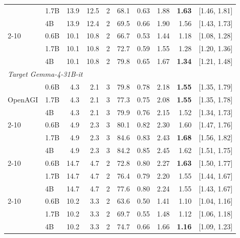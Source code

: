 \begin{table}[t]
\begin{tabular}{llrrrrrrrc}
                & 1.7B & 13.9 & 12.5 & 2 & 68.1 & 0.63 & 1.88 & \textbf{1.63\xx{}} & [1.46, 1.81] \\
                & 4B   & 13.9 & 12.4 & 2 & 69.5 & 0.66 & 1.90 & 1.56\xx{} & [1.43, 1.73] \\
\cmidrule(lr){2-10}
\multirow{3}{*}{BFCL multi-turn} & 0.6B & 10.1 & 10.8 & 2 & 66.7 & 0.53 & 1.44 & 1.18\xx{} & [1.08, 1.28] \\
                & 1.7B & 10.1 & 10.8 & 2 & 72.7 & 0.59 & 1.55 & 1.28\xx{} & [1.20, 1.36] \\
                & 4B   & 10.1 & 10.8 & 2 & 79.8 & 0.65 & 1.67 & \textbf{1.34\xx{}} & [1.21, 1.48] \\
\midrule
\multicolumn{10}{l}{\emph{Target Gemma-4-31B-it}} \\
\midrule
\multirow{3}{*}{OpenAGI} & 0.6B & 4.3  & 2.1 & 3 & 79.8 & 0.78 & 2.18 & \textbf{1.55\xx{}} & [1.35, 1.79] \\
                & 1.7B & 4.3  & 2.1 & 3 & 77.3 & 0.75 & 2.08 & \textbf{1.55\xx{}} & [1.35, 1.78] \\
                & 4B   & 4.3  & 2.1 & 3 & 79.9 & 0.76 & 2.15 & 1.52\xx{} & [1.34, 1.73] \\
\cmidrule(lr){2-10}
\multirow{3}{*}{TaskBench} & 0.6B & 4.9  & 2.3 & 3 & 80.1 & 0.82 & 2.30 & 1.60\xx{} & [1.47, 1.76] \\
                & 1.7B & 4.9  & 2.3 & 3 & 84.6 & 0.83 & 2.43 & \textbf{1.68\xx{}} & [1.56, 1.82] \\
                & 4B   & 4.9  & 2.3 & 3 & 84.2 & 0.85 & 2.45 & 1.62\xx{} & [1.51, 1.75] \\
\cmidrule(lr){2-10}
\multirow{3}{*}{$\tau^2$-bench} & 0.6B & 14.7 & 4.7 & 2 & 72.8 & 0.80 & 2.27 & \textbf{1.63\xx{}} & [1.50, 1.77] \\
                & 1.7B & 14.7 & 4.7 & 2 & 76.4 & 0.79 & 2.20 & 1.55\xx{} & [1.44, 1.67] \\
                & 4B   & 14.7 & 4.7 & 2 & 77.6 & 0.80 & 2.24 & 1.55\xx{} & [1.43, 1.67] \\
\cmidrule(lr){2-10}
\multirow{3}{*}{BFCL multi-turn} & 0.6B & 10.2 & 3.3 & 2 & 63.6 & 0.50 & 1.41 & 1.10\xx{} & [1.04, 1.16] \\
                & 1.7B & 10.2 & 3.3 & 2 & 69.7 & 0.55 & 1.48 & 1.12\xx{} & [1.06, 1.18] \\
                & 4B   & 10.2 & 3.3 & 2 & 74.7 & 0.66 & 1.66 & \textbf{1.16\xx{}} & [1.09, 1.23] \\
\bottomrule
\end{tabular}
\end{table}

